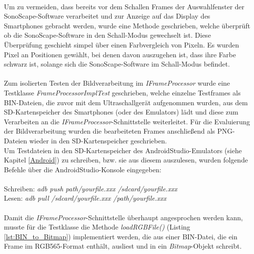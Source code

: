 ~\\
Um zu vermeiden, dass bereits vor dem Schallen Frames der Auswahlfenster der SonoScape-Software verarbeitet und zur Anzeige auf das Display des Smartphones gebracht werden, wurde eine Methode geschrieben, welche überprüft ob die SonoScape-Software in den Schall-Modus gewechselt ist. Diese Überprüfung geschieht simpel über einen Farbvergleich von Pixeln. Es wurden Pixel an Positionen gewählt, bei denen davon auszugehen ist, dass ihre Farbe schwarz ist, solange sich die SonoScape-Software im Schall-Modus befindet.  
\\
\\
Zum isolierten Testen der Bildverarbeitung im \textit{IFrameProcessor} wurde eine Testklasse \textit{FrameProcessorImplTest} geschrieben, welche einzelne Testframes als BIN-Dateien, die zuvor mit dem Ultraschallgerät aufgenommen wurden, aus dem SD-Kartenspeicher des Smartphones (oder des Emulators) lädt und diese zum Verarbeiten an die \textit{IFrameProcessor}-Schnittstelle weiterleitet. Für die Evaluierung der Bildverarbeitung wurden die bearbeiteten Frames anschließend als PNG-Dateien wieder in den SD-Kartenspeicher geschrieben. 
\\
Um Testdateien in den SD-Kartenspeicher des AndroidStudio-Emulators (siehe Kapitel \ref{Android}) zu schreiben, bzw. sie aus diesem auszulesen, wurden folgende Befehle über die AndroidStudio-Konsole eingegeben:
\\
\\
Schreiben: \textit{adb push path/yourfile.xxx /sdcard/yourfile.xxx}
\\
Lesen: \textit{adb pull /sdcard/yourfile.xxx /path/yourfile.xxx}
\\
\\
Damit die \textit{IFrameProcessor}-Schnittstelle überhaupt angesprochen werden kann, musste für die Testklasse die Methode \textit{loadRGBFile()} (Listing \ref{lst:BIN_to_Bitmap}) implementiert werden, die aus einer BIN-Datei, die ein Frame im RGB565-Format enthält, ausliest und in ein \textit{Bitmap}-Objekt schreibt. 

